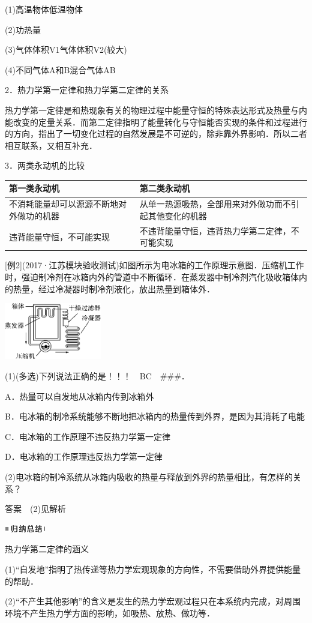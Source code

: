 (1)高温物体低温物体

(2)功热量

(3)气体体积V1气体体积V2(较大)

(4)不同气体A和B混合气体AB

2．热力学第一定律和热力学第二定律的关系

热力学第一定律是和热现象有关的物理过程中能量守恒的特殊表达形式及热量与内能改变的定量关系．而第二定律指明了能量转化与守恒能否实现的条件和过程进行的方向，指出了一切变化过程的自然发展是不可逆的，除非靠外界影响．所以二者相互联系，又相互补充．

3．两类永动机的比较

\begin{longtable}[]{@{}ll@{}}
\toprule
第一类永动机 & 第二类永动机\tabularnewline
\midrule
\endhead
不消耗能量却可以源源不断地对外做功的机器 &
从单一热源吸热，全部用来对外做功而不引起其他变化的机器\tabularnewline
违背能量守恒，不可能实现 &
不违背能量守恒，违背热力学第二定律，不可能实现\tabularnewline
\bottomrule
\end{longtable}

{[}例2{]}(2017·江苏模块验收测试)如图所示为电冰箱的工作原理示意图．压缩机工作时，强迫制冷剂在冰箱内外的管道中不断循环．在蒸发器中制冷剂汽化吸收箱体内的热量，经过冷凝器时制冷剂液化，放出热量到箱体外．

\begin{center}\includegraphics[width=1.67014in,height=0.97153in]{media/image507.png}\end{center}
(1)(多选)下列说法正确的是！！！　BC　\#\#\#．

A．热量可以自发地从冰箱内传到冰箱外

B．电冰箱的制冷系统能够不断地把冰箱内的热量传到外界，是因为其消耗了电能

C．电冰箱的工作原理不违反热力学第一定律

D．电冰箱的工作原理违反热力学第一定律

(2)电冰箱的制冷系统从冰箱内吸收的热量与释放到外界的热量相比，有怎样的关系？

答案　(2)见解析

\begin{center}\includegraphics[width=0.70764in,height=0.12292in]{media/image13.png}\end{center}
热力学第二定律的涵义

(1)``自发地''指明了热传递等热力学宏观现象的方向性，不需要借助外界提供能量的帮助．

(2)``不产生其他影响''的含义是发生的热力学宏观过程只在本系统内完成，对周围环境不产生热力学方面的影响，如吸热、放热、做功等．
